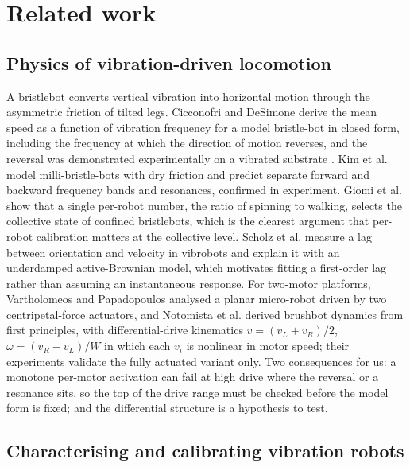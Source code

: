 \section{Related work}\label{sec:related-work}

\subsection{Physics of vibration-driven
locomotion}

A bristlebot converts vertical vibration into horizontal motion through
the asymmetric friction of tilted legs. Cicconofri and DeSimone
\cite{cicconofri2015motility} derive the mean speed as a function of
vibration frequency for a model bristle-bot in closed form, including
the frequency at which the direction of motion reverses, and the
reversal was demonstrated experimentally on a vibrated substrate
\cite{cicconofri2016inversion}. Kim et al. \cite{kim2020millibristle}
model milli-bristle-bots with dry friction and predict separate forward
and backward frequency bands and resonances, confirmed in experiment.
Giomi et al. \cite{giomi2013bristlebots} show that a single per-robot
number, the ratio of spinning to walking, selects the collective state
of confined bristlebots, which is the clearest argument that per-robot
calibration matters at the collective level. Scholz et al.
\cite{scholz2018inertial} measure a lag between orientation and
velocity in vibrobots and explain it with an underdamped active-Brownian
model, which motivates fitting a first-order lag rather than assuming an
instantaneous response. For two-motor platforms, Vartholomeos and
Papadopoulos \cite{vartholomeos2006microrobot} analysed a planar
micro-robot driven by two centripetal-force actuators, and Notomista et
al. \cite{notomista2019brushbot} derived brushbot dynamics from first
principles, with differential-drive kinematics \(v=(v_L+v_R)/2\),
\(\omega=(v_R-v_L)/W\) in which each \(v_i\) is nonlinear in motor
speed; their experiments validate the fully actuated variant only. Two
consequences for us: a monotone per-motor activation can fail at high
drive where the reversal or a resonance sits, so the top of the drive
range must be checked before the model form is fixed; and the
differential structure is a hypothesis to test.

\subsection{Characterising and calibrating vibration
robots}

